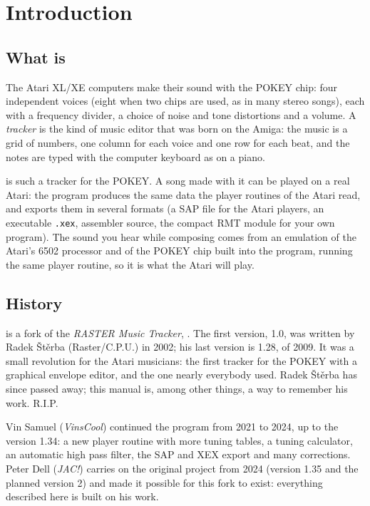 \chapter{Introduction}\label{ch:intro}

\section{What \RITMO{} is}

The Atari XL/XE computers make their sound with the POKEY chip: four independent voices
(eight when two chips are used, as in many stereo songs), each with a frequency divider, a
choice of noise and tone distortions and a volume. A \emph{tracker} is the kind of music editor
that was born on the Amiga: the music is a grid of numbers, one column for each voice and one
row for each beat, and the notes are typed with the computer keyboard as on a piano.

\RITMO{} is such a tracker for the POKEY. A song made with it can be played on a real Atari: the
program produces the same data the player routines of the Atari read, and exports them in
several formats (a SAP file for the Atari players, an executable \texttt{.xex}, assembler source,
the compact RMT module for your own program). The sound you hear while composing comes from an
emulation of the Atari's 6502 processor and of the POKEY chip built into the program, running
the same player routine, so it is what the Atari will play.


\section{History}

\RITMO{} is a fork of the \emph{RASTER Music Tracker}, \RMT{}. The first version, 1.0, was
written by Radek \v{S}t\v{e}rba (Raster/C.P.U.) in 2002; his last version is 1.28, of 2009. It was
a small revolution for the Atari musicians: the first tracker for the POKEY with a
graphical envelope editor, and the one nearly everybody used. Radek \v{S}t\v{e}rba has since
passed away; this manual is, among other things, a way to remember his work. R.I.P.

Vin Samuel (\emph{VinsCool}) continued the program from 2021 to 2024, up to the version 1.34: a
new player routine with more tuning tables, a tuning calculator, an automatic high pass filter,
the SAP and XEX export and many corrections. Peter Dell (\emph{JAC!}) carries on the original
project from 2024 (version 1.35 and the planned version 2) and made it possible for this fork
to exist: everything described here is built on his work.

